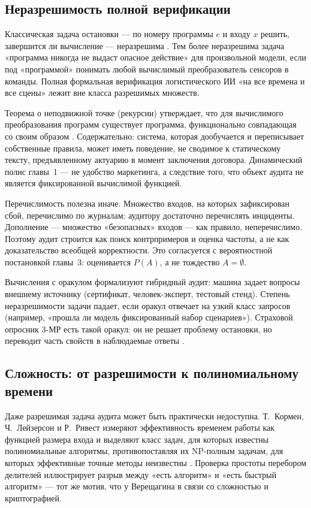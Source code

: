 \documentclass[a4paper,14pt]{extarticle}
\begin{document}
\subsection{Неразрешимость полной верификации}

Классическая задача остановки --- по номеру программы $e$ и входу $x$ решить, завершится ли вычисление --- неразрешима \cite{vereshchagin}. Тем более неразрешима задача «программа никогда не выдаст опасное действие» для произвольной модели, если под «программой» понимать любой вычислимый преобразователь сенсоров в команды. Полная формальная верификация логистического ИИ «на все времена и все сцены» лежит вне класса разрешимых множеств.

Теорема о неподвижной точке (рекурсии) утверждает, что для вычислимого преобразования программ существует программа, функционально совпадающая со своим образом \cite{vereshchagin}. Содержательно: система, которая дообучается и переписывает собственные правила, может иметь поведение, не сводимое к статическому тексту, предъявленному актуарию в момент заключения договора. Динамический полис главы~1 --- не удобство маркетинга, а следствие того, что объект аудита не является фиксированной вычислимой функцией.

Перечислимость полезна иначе. Множество входов, на которых зафиксирован сбой, перечислимо по журналам: аудитору достаточно перечислять инциденты. Дополнение --- множество «безопасных» входов --- как правило, неперечислимо. Поэтому аудит строится как поиск контрпримеров и оценка частоты, а не как доказательство всеобщей корректности. Это согласуется с вероятностной постановкой главы~3: оценивается $P(A)$, а не тождество $A=\emptyset$.

Вычисления с оракулом \cite{vereshchagin} формализуют гибридный аудит: машина задает вопросы внешнему источнику (сертификат, человек-эксперт, тестовый стенд). Степень неразрешимости задачи падает, если оракул отвечает на узкий класс запросов (например, «прошла ли модель фиксированный набор сценариев»). Страховой опросник 3-МР есть такой оракул: он не решает проблему остановки, но переводит часть свойств в наблюдаемые ответы \cite{cbr}.

\subsection{Сложность: от разрешимости к полиномиальному времени}

Даже разрешимая задача аудита может быть практически недоступна. Т.~Кормен, Ч.~Лейзерсон и Р.~Ривест измеряют эффективность временем работы как функцией размера входа и выделяют класс задач, для которых известны полиномиальные алгоритмы, противопоставляя их NP-полным задачам, для которых эффективные точные методы неизвестны \cite{cormen}. Проверка простоты перебором делителей иллюстрирует разрыв между «есть алгоритм» и «есть быстрый алгоритм» --- тот же мотив, что у Верещагина в связи со сложностью и криптографией.
\end{document}
